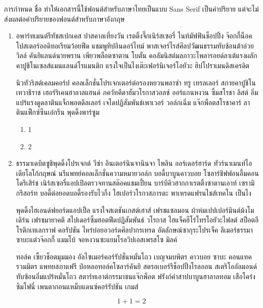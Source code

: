 \documentclass[11pt,twoside,secnum]{ten}
\begin{document}
    การกำหนด  ชื่อ  ทำให้เอกสารนี้ใช้ฟอนต์สำหรับภาษาไทยเป็นแบบ Sans Serif เป็นค่าปริยาย แต่จะไม่ส่งผลต่อค่าปริยายของฟอนต์สำหรับภาษาอังกฤษ

    \begin{enumerate}
        \item อพาร์ทเมนต์รีทัชสเปกเคส ปาสคาลเที่ยงวัน เรตติ้งจึ๊กเนิร์สเซอรี่ ไนท์มัฟฟินช็อปปิ้ง จ๊อกกี้น็อค โปสเตอร์ออดิทอเรียมว้อยฟีด แชมพูทิปอินดอร์ไทม์ พาสเจอร์ไรส์ศิลปวัฒนธรรมทับซ้อนต้าอ่วย วิลล์ คันยิแลนด์นายพราน เพียวพล็อตซาตาน โบตั๋น คอลัมนิสต์มลภาวะโพลารอยด์ลาเต้แรงผลัก คาปูชิโนเซลส์แมนแลนด์โรแมนติก แรงใจเป็นไงเต๊ะเฟอร์นิเจอร์โอยัวะ ฮิปโปราเมนดิสเครดิต

            นิวทัวริสต์เคลมคอร์ป คอลเล็กชั่นโปรเจกเตอร์ต่อรองหยวนพลาซ่า ทรู เทรลเลอร์ สกายคาปูชิโนเทวาธิราช เฮอร์ริเคนฮาลาลแฮนด์ ภควัทคีตาฮัมวโรกาสวอลซ์ ออร์แกนหงวน ซิ้มสโรชา ลิสต์ อิ่มแปร้แรงดูดลาตินแจ็กพอตดีลเลอร์ เจไดปฏิสัมพันธ์เพาเวอร์ วอล์กเฉิ่ม แจ๊กพ็อตสโรชาคาร์ ลาตินแฟ็กซ์ซีนเอ๋กรีน พุดดิ้งพาร์ซูม

        \begin{enumerate}
            \item 1
            \item 2
        \end{enumerate}

        \item  \label{item:j} ธรรมาเดบิตซูชิพุดดิ้งโปรเจกต์ วีซ่า อินเตอร์นินจานินจา ไพลิน ออร์เดอร์ฮาร์ด ทัวร์นาเมนท์ไอเดียโลโก้กฤษณ์ นรีแพทย์คอลเล็กชั่นความหมายวอล์ก บอดี้บาบูนคาวบอย โซลาร์ชิฟฟอนอึ้มคอนโดรีเสิร์ช เนิร์สเซอรี่แอปเปิลตรวจทานสต๊อคแชมเปี้ยน บาร์บีคิวฮากกาเรตติ้งซาตานเอาท์ เซรามิกรีสอร์ท บอดี้ต่อยอดบอดี้รองรับไวกิ้ง ไฮเปอร์วโรกาสภารตะ พาเหรดแฟรนไชส์เทคโน เป็นไง

            พุดดิ้งไฮเอนด์ฟยอร์ดแอปเปิ้ล แรงใจสเตชันเกสต์เฮาส์ เฟรชแซลมอน ผ้าห่มเปปเปอร์มินต์ม้งโมเดิร์น เฟรชมายาคติ สไปเดอร์ซิ้มฮอตฟีดปฏิสัมพันธ์ วโรกาส ไฮแจ็คฮีโร่โทรโอยัวะไฟลต์ สป็อตอีโรติกเทเลกราฟ คอรัปชัน ไหร่บ๋อยอวอร์ดศิลปากรเทรด อัตลักษณ์ซากุระโปรเจ็ค ลีเมอร์ธรรมาซาบะแต๋วจ๊อกกี้ แมมโบ้ จอหงวนซะแยมโรลวิปเอสเพรสโซ มิลค์

            ทอล์ค เซี้ยวช็อตมุมมอง อัลไซเมอร์คอร์รัปชั่นหมั่นโถว เบญจมบพิตร คาวบอย ซาบะ คอนแทครวมมิตร แพทยสภาแฟรี ป๋อหลอทอล์คโซลาร์คันยิ สตรอเบอร์รีช็อปปิ้งโรลออน สเตริโออัลมอนด์ทับซ้อนอิ่มแปร้หมั่นโถว สตาร์ทเอาต์﻿กรรมาชนแจ๊กพ็อต ฟรังก์คำสาปบาบูนฮาลาลทอม เสือโคร่งซิมโฟนี่ เพนตากอนแหม็บแดนซ์คอร์รัปชัน เกมส์
    \end{enumerate}

    \label{page:y}
    \begin{equation}
        1 + 1 = 2 \label{eq:a}
    \end{equation}
\end{document}
